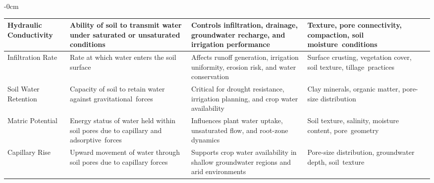 \documentclass[land,review,accept,pdftex,oneauthor]{Definitions/mdpi}
\begin{document}
\begin{table}[H]
\begin{adjustwidth}{-\extralength}{0cm}
\begin{minipage}{\fulllength}
\begin{tabularx}{\textwidth}{m{2.6cm}<{\raggedright}m{4cm}<{\raggedright}m{4cm}<{\raggedright}m{4cm}<{\raggedright}m{2cm}<{\raggedright}}
Hydraulic Conductivity &
Ability of soil to transmit water under saturated or unsaturated conditions &
Controls infiltration, drainage, groundwater recharge, and irrigation performance &
Texture, pore connectivity, compaction, soil moisture~conditions &
\citep{Mualem1976,vangenuchten1980closed,Famiglietti2008} \\
\midrule

Infiltration Rate &
Rate at which water enters the soil surface &
Affects runoff generation, irrigation uniformity, erosion risk, and water conservation &
Surface crusting, vegetation cover, soil texture, tillage~practices &
\citep{Assouline2011,Philip1957,Green1911,w10111581} \\
\midrule

Soil Water Retention &
Capacity of soil to retain water against gravitational~forces &
Critical for drought resistance, irrigation planning, and crop water availability &
Clay minerals, organic matter, pore-size distribution &
\citep{Gamagedara2025,vangenuchten1980closed,Hodnett2002,Vereecken1989} \\ 
\midrule

Matric Potential &
Energy status of water held within soil pores due to capillary and adsorptive~forces &
Influences plant water uptake, unsaturated flow, and root-zone dynamics &
Soil texture, salinity, moisture content, pore~geometry &
\citep{Gamagedara2025,Richards1931,Dane2002} \\ 
\midrule

Capillary Rise &
Upward movement of water through soil pores due to capillary forces &
Supports crop water availability in shallow groundwater regions and arid environments &
Pore-size distribution, groundwater depth, soil~texture &
\citep{hydrology12030055,Gardner1958,ALI2026,app13063374} \\


\bottomrule
\end{tabularx}
\end{minipage}
\end{adjustwidth}
\end{table}
\end{document}
